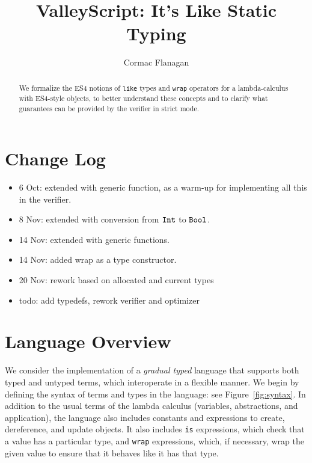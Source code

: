 \documentclass{article}
\newcommand{\Int}{\t{Int}}
\newcommand{\Bool}{\t{Bool}}
\renewcommand{\t}[1]{{\tt #1}}
\begin{document}
\title{ValleyScript: It's Like Static Typing
}
\author{Cormac Flanagan}


\maketitle

\begin{abstract}
We formalize the ES4 notions of \t{like} types and \t{wrap} operators for a lambda-calculus with ES4-style objects,
to better understand these concepts and to clarify what guarantees can be provided by the verifier in strict mode.
\end{abstract}

\section{Change Log}
\begin{itemize}
\item
6 Oct: extended with generic function, as a warm-up for implementing all this in the verifier.
\item
8 Nov: extended with conversion from $\Int$ to $\Bool$.
\item
14 Nov: extended with generic functions.
\item
14 Nov: added wrap as a type constructor.
\item 
20 Nov: rework based on allocated and current types
\item
todo: add typedefs, rework verifier and optimizer
\end{itemize}

\section{Language Overview}

We consider the implementation of a \emph{gradual typed} language that supports both
typed and untyped terms, which interoperate in a flexible manner.
We begin by defining the syntax of terms and types in the language: see Figure~\ref{fig:syntax}.
In addition to the usual terms of the lambda calculus (variables, abstractions, and application), 
the language also includes constants and expressions to create, dereference, and update objects.
It also includes \t{is} expressions, which check that a value has a particular type,
and \t{wrap} expressions, which, if necessary, wrap the given value to ensure that it behaves like it has that type. 
\end{document}
